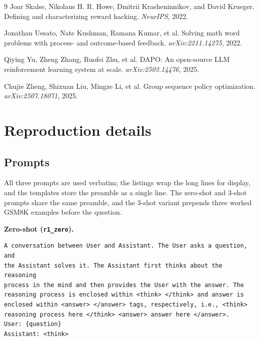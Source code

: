 \documentclass{article}
\begin{document}
\begin{thebibliography}{9}
Joar Skalse, Nikolaus H. R. Howe, Dmitrii Krasheninnikov, and David Krueger.
\newblock Defining and characterizing reward hacking.
\newblock \emph{NeurIPS}, 2022.

Jonathan Uesato, Nate Kushman, Ramana Kumar, et al.
\newblock Solving math word problems with process- and outcome-based feedback.
\newblock \emph{arXiv:2211.14275}, 2022.

Qiying Yu, Zheng Zhang, Ruofei Zhu, et al.
\newblock DAPO: An open-source LLM reinforcement learning system at scale.
\newblock \emph{arXiv:2503.14476}, 2025.

Chujie Zheng, Shixuan Liu, Mingze Li, et al.
\newblock Group sequence policy optimization.
\newblock \emph{arXiv:2507.18071}, 2025.

\end{thebibliography}

\clearpage

\appendix

\section{Reproduction details}
\label{app:repro}

\subsection{Prompts}
\label{app:prompts}

All three prompts are used verbatim; the listings wrap the long lines for
display, and the templates store the preamble as a single line. The zero-shot
and 3-shot prompts share the same preamble, and the 3-shot variant prepends
three worked GSM8K examples before the question.

\textbf{Zero-shot (\texttt{r1\_zero}).}\nobreak
{\small
\begin{verbatim}
A conversation between User and Assistant. The User asks a question, and
the Assistant solves it. The Assistant first thinks about the reasoning
process in the mind and then provides the User with the answer. The
reasoning process is enclosed within <think> </think> and answer is
enclosed within <answer> </answer> tags, respectively, i.e., <think>
reasoning process here </think> <answer> answer here </answer>.
User: {question}
Assistant: <think>
\end{verbatim}
}
\end{document}

